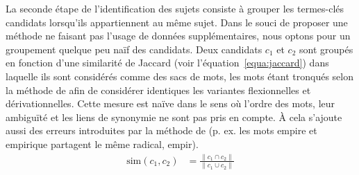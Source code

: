     La seconde étape de l'identification des sujets consiste à grouper les
    termes-clés candidats lorsqu'ils appartiennent au même sujet.
    Dans le souci de proposer une méthode ne faisant pas l'usage de données
    supplémentaires, nous optons pour un groupement quelque peu naïf des
    candidats. Deux candidats $c_1$ et $c_2$ sont groupés en fonction d'une
    similarité de Jaccard (voir l'équation~\ref{equa:jaccard}) dans laquelle ils
    sont considérés comme des sacs de mots, les mots étant tronqués selon la
    méthode de  afin de considérer identiques
    les variantes flexionnelles et dérivationnelles. Cette mesure est naïve dans
    le sens où l'ordre des mots, leur ambiguïté et les liens de synonymie ne
    sont pas pris en compte. À cela s'ajoute aussi des erreurs introduites par
    la méthode de  (p. ex. les mots
    \og{}empire\fg{} et \og{}empirique\fg{} partagent le même radical,
    \og{}empir\fg{}).
    \begin{align}
      \text{sim}(c_1, c_2) &= \frac{\|c_1 \cap c_2\|}{\|c_1 \cup c_2\|} \label{equa:jaccard}
    \end{align}

